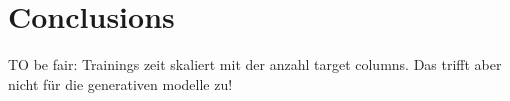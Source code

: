 
\section{Conclusions}


TO be fair: Trainings zeit skaliert mit der anzahl target columns. Das trifft aber nicht für die generativen modelle zu!

